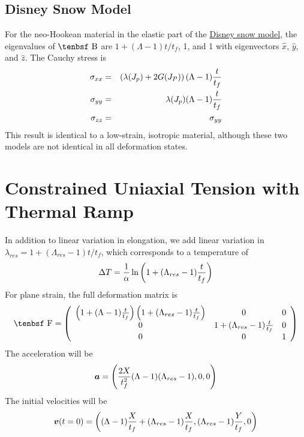 \documentclass[11pt]{book}
\renewcommand{\vec}[1]{\boldsymbol{#1}}
\def\B{\hbox{\tenbsf B}}
\def\F{\hbox{\tenbsf F}}
\begin{document}
\subsection{Disney Snow Model}

For the neo-Hookean material in the elastic part of the \hyperref[NHM]{Disney snow model}, the eigenvalues of $\B$ are $1+(\Lambda-1)t/t_f$, 1, and 1 with eigenvectors $\hat x$, $\hat y$, and $\hat z$. The Cauchy stress is
\begin{eqnarray}
   \sigma_{xx} & = & \left( \lambda(J_p)+ 2G(J_P) \right)(\Lambda-1){t\over t_f}  \\
   \sigma_{yy} & = & \lambda(J_p)(\Lambda-1){t\over t_f} \\
   \sigma_{zz} & = &  \sigma_{yy}
\end{eqnarray}
This result is identical to a low-strain, isotropic material, although these two models are not identical in all deformation states.

\section{Constrained Uniaxial Tension with Thermal Ramp}

In addition to linear variation in elongation, we add linear variation in $\lambda_{res} = 1 + (\Lambda_{res}-1)t/t_f$, which corresponds to a temperature of
\begin{equation}
     \Delta T = {1\over\alpha}\ln \left(1 + (\Lambda_{res}-1){t\over t_f}\right)
\end{equation}
For plane strain, the full deformation matrix is
\begin{equation}
    \F = \left(\begin{array}{ccc} \left(1+(\Lambda-1){t\over t_f}\right)\left(1 + (\Lambda_{res}-1){t\over t_f}\right) & 0 & 0 \\
               0 & 1 + (\Lambda_{res}-1){t\over t_f} & 0 \\
               0 & 0 & 1 \end{array} \right)
\end{equation}
The acceleration will be
\begin{equation}
     \vec a = \left( {2X\over t_f^2}(\Lambda-1)(\Lambda_{res}-1),0,0 \right)
\end{equation}
The initial velocities will be
\begin{equation}
   \vec v(t=0) = \left( (\Lambda-1){X\over t_f} + (\Lambda_{res}-1){X\over t_f}, (\Lambda_{res}-1){Y\over t_f},0\right)
\end{equation}
\end{document}
